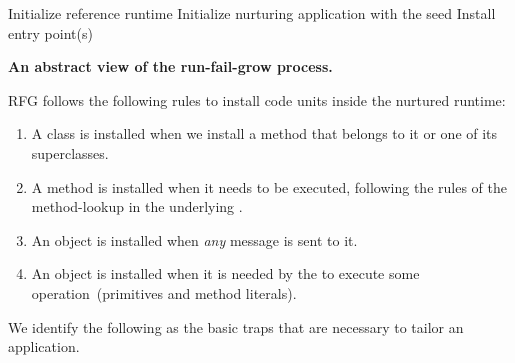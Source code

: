 \begin{algorithm}[ht]
 Initialize reference runtime\;
 Initialize nurturing application with the seed\;
 Install entry point(s)\;
 \caption{\textbf{An abstract view of the run-fail-grow process.}\label{alg:tailoring_process}}
\end{algorithm}

RFG follows the following rules to install code units inside the nurtured runtime:

\begin{enumerate}
\item A class is installed when we install a method that belongs to it or one of its superclasses.
\item A method is installed when it needs to be executed, following the rules of the method-lookup in the underlying \VM.
\item An object is installed when \emph{any} message is sent to it.%
\item An object is installed when it is needed by the \VM to execute some operation~(\eg primitives and method literals).
\end{enumerate}

We identify the following as the basic traps that are necessary to tailor an application.

